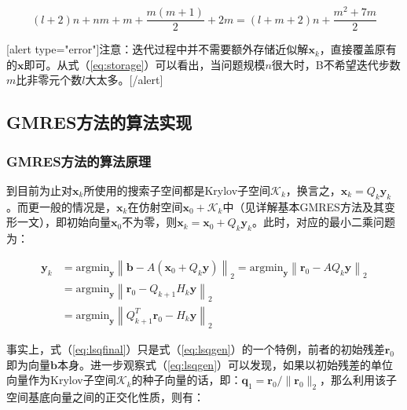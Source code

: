 \documentclass[UTF8,nofonts]{ctexart}
\begin{document}
\begin{equation}
\label{eq:storage}
(l+2)n+nm+m+\dfrac{m(m+1)}{2}+2m=(l+m+2)n+\dfrac{m^2+7m}{2}
\end{equation}

[alert type="error"]注意：迭代过程中并不需要额外存储近似解$\boldsymbol{x}_k$，直接覆盖原有的$\boldsymbol{x}$即可。从式（\ref{eq:storage}）可以看出，当问题规模$n$很大时，B不希望迭代步数$m$比非零元个数$l$大太多。[/alert]

\subsection*{GMRES方法的算法实现}
\label{sub:GMRES方法的算法实现}

\subsubsection*{GMRES方法的算法原理}
\label{subs:GMRES方法的算法原理}

到目前为止对$\boldsymbol{x}_k$所使用的搜索子空间都是Krylov子空间$\mathcal{K}_k$，换言之，$\boldsymbol{x}_k=Q_k\boldsymbol{y}_k$。而更一般的情况是，$\boldsymbol{x}_k$在仿射空间$\boldsymbol{x}_0+\mathcal{K}_k$中（见详解基本GMRES方法及其变形一文），即初始向量$\boldsymbol{x}_0$不为零，则$\boldsymbol{x}_k=\boldsymbol{x}_0+Q_k\boldsymbol{y}_k$。此时，对应的最小二乘问题为：

\begin{equation}
\label{eq:lsqgen}
\begin{aligned}
\boldsymbol{y}_k &= \text{argmin}_{\boldsymbol{y}}\left\|\boldsymbol{b}-A(\boldsymbol{x}_0+Q_k\boldsymbol{y})\right\|_2=\text{argmin}_{\boldsymbol{y}}\left\|\boldsymbol{r}_0-AQ_k\boldsymbol{y}\right\|_2 \\
&= \text{argmin}_{\boldsymbol{y}}\left\|\boldsymbol{r}_0-Q_{k+1}H_k\boldsymbol{y}\right\|_2 \\
&= \text{argmin}_{\boldsymbol{y}}\left\|Q^T_{k+1}\boldsymbol{r}_0-H_k\boldsymbol{y}\right\|_2
\end{aligned}
\end{equation}

事实上，式（\ref{eq:lsqfinal}）只是式（\ref{eq:lsqgen}）的一个特例，前者的初始残差$\boldsymbol{r}_0$即为向量$\boldsymbol{b}$本身。进一步观察式（\ref{eq:lsqgen}）可以发现，如果以初始残差的单位向量作为Krylov子空间$\mathcal{K}_k$的种子向量的话，即：$\boldsymbol{q}_1=\boldsymbol{r}_0/\|\boldsymbol{r}_0\|_2$，那么利用该子空间基底向量之间的正交化性质，则有：
\end{document}
